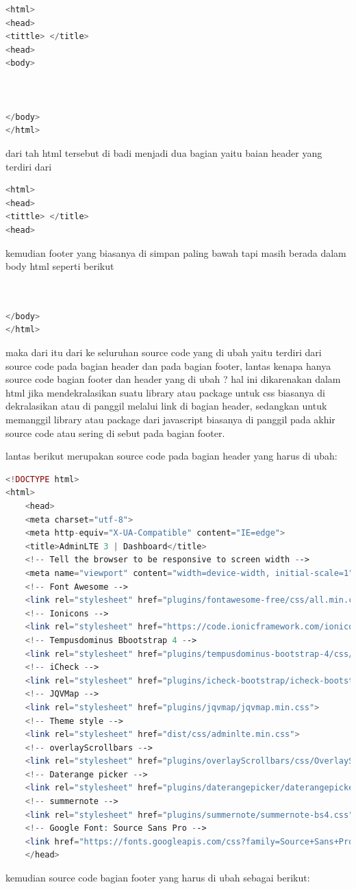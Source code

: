 \begin{lstlisting}[language=PHP]
<html>
<head>
<tittle> </title>
<head>
<body>



</body>
</html>
\end{lstlisting}

dari tah html tersebut di badi menjadi dua bagian yaitu baian header yang terdiri dari 
\begin{lstlisting}[language=PHP]
<html>
<head>
<tittle> </title>
<head>
\end{lstlisting}
\pagebreak
kemudian footer yang biasanya di simpan paling bawah tapi masih berada dalam body html seperti berikut 
\begin{lstlisting}[language=PHP]


</body>
</html>
\end{lstlisting}




maka dari itu dari ke seluruhan source code yang di ubah yaitu terdiri dari source code pada bagian header dan pada bagian footer, lantas kenapa hanya source code bagian footer dan header yang di ubah ? hal ini dikarenakan dalam html jika mendekralasikan suatu library atau package untuk css biasanya di dekralasikan atau di panggil melalui link di bagian header, sedangkan untuk memanggil library atau package dari javascript biasanya di panggil pada akhir source code atau sering di sebut pada bagian footer.\par

lantas berikut merupakan source code pada bagian header yang harus di ubah:
\begin{lstlisting}[language=PHP]
<!DOCTYPE html>  
<html>  
	<head>  
	<meta charset="utf-8">  
	<meta http-equiv="X-UA-Compatible" content="IE=edge">  
	<title>AdminLTE 3 | Dashboard</title>  
	<!-- Tell the browser to be responsive to screen width -->  
	<meta name="viewport" content="width=device-width, initial-scale=1">  
	<!-- Font Awesome -->  
	<link rel="stylesheet" href="plugins/fontawesome-free/css/all.min.css">  
	<!-- Ionicons -->  
	<link rel="stylesheet" href="https://code.ionicframework.com/ionicons/2.0.1/css/ionicons.min.css">  
	<!-- Tempusdominus Bbootstrap 4 -->  
	<link rel="stylesheet" href="plugins/tempusdominus-bootstrap-4/css/tempusdominus-bootstrap-4.min.css">  
	<!-- iCheck -->  
	<link rel="stylesheet" href="plugins/icheck-bootstrap/icheck-bootstrap.min.css">  
	<!-- JQVMap -->  	
	<link rel="stylesheet" href="plugins/jqvmap/jqvmap.min.css">  
	<!-- Theme style -->  
	<link rel="stylesheet" href="dist/css/adminlte.min.css">  
	<!-- overlayScrollbars -->  
	<link rel="stylesheet" href="plugins/overlayScrollbars/css/OverlayScrollbars.min.css">  
	<!-- Daterange picker -->  
	<link rel="stylesheet" href="plugins/daterangepicker/daterangepicker.css">  
	<!-- summernote -->  
	<link rel="stylesheet" href="plugins/summernote/summernote-bs4.css">  
	<!-- Google Font: Source Sans Pro -->  
	<link href="https://fonts.googleapis.com/css?family=Source+Sans+Pro:300,400,400i,700" rel="stylesheet">  
	</head>  

\end{lstlisting}
\pagebreak
kemudian source code bagian footer yang harus di ubah sebagai berikut:

